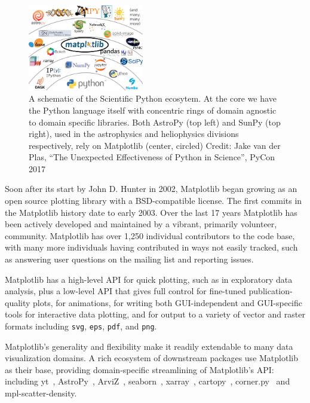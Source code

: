 \documentclass[12pt]{article}
\numberwithin{page}{section}
\begin{document}
\begin{figure}
  \includegraphics[width=0.45\textwidth]{scipy-ecosystem}
  \caption{A schematic of the Scientific Python ecosytem.  At the
    core we have the Python language itself with concentric rings of
    domain agnostic to domain specific libraries.  Both AstroPy (top
    left) and SunPy (top right), used in the astrophysics and
    heliophysics divisions respectively, rely on Matplotlib (center, circled)
    Credit: Jake van der Plas, ``The Unexpected Effectiveness of Python
    in Science'', PyCon 2017}
  \label{fig:ecosystem}
\end{figure}


Soon after its start by John D. Hunter in 2002, Matplotlib began growing as an
open source plotting
library with a BSD-compatible license. The
first commits in the Matplotlib history date to early 2003.  Over the
last 17 years Matplotlib has been actively developed and maintained by
a vibrant, primarily volunteer, community.  Matplotlib has over 1,250
individual contributors to the code base, with many more individuals
having contributed in ways not easily tracked, such as answering user
questions on the mailing list and reporting issues.

Matplotlib has a high-level API for quick plotting, such as in
exploratory data analysis, plus a low-level API that gives full control for
fine-tuned publication-quality plots, for animations, for writing both
GUI-independent and GUI-specific tools for interactive data plotting, and
for output to a variety of vector and raster
formats including \texttt{svg}, \texttt{eps},
\texttt{pdf}, and \texttt{png}.

Matplotlib's generality and flexibility make it readily extendable to
many data visualization domains.  A rich ecosystem of downstream packages use
Matplotlib as their base, providing domain-specific streamlining of
Matplotlib's API: including
yt~\cite{2011ApJS..192....9T}, AstroPy~\cite{astropy:2013,
  astropy:2018}, ArviZ~\cite{arviz_2019},
seaborn~\cite{waskom2020seaborn}, xarray~\cite{hoyer2017xarray},
cartopy~\cite{Cartopy}, corner.py~\cite{corner} and
mpl-scatter-density\cite{robitaille_thomas_p_2019}.
\end{document}
